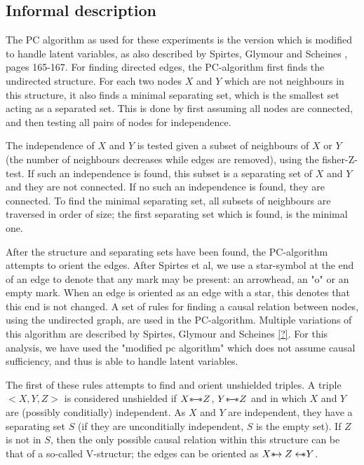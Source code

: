 \documentclass[a4paper, 10pt, english, onecolumn]{article}
\def \srightarrow {\text{\textasteriskcentered}\hspace{-0.62em}\rightarrow}
\def \sleftarrow {\leftarrow\hspace{-0.62em}\text{\textasteriskcentered}}
\def \sline {\text{\textasteriskcentered}\hspace{-0.38em}-\hspace{-0.4em}\text{\textasteriskcentered}}
\begin{document}
\subsection{Informal description}
The PC algorithm as used for these experiments is the version which is modified to handle latent variables, as also described by Spirtes, Glymour and Scheines \cite{spirtes2000}, pages 165-167.
For finding directed edges, the PC-algorithm first finds the undirected structure.
For each two nodes $X$ and $Y$ which are not neighbours in this structure, it also finds a minimal separating set, which is the smallest set acting as a separated set.
This is done by first assuming all nodes are connected, and then testing all pairs of nodes for independence.

The independence of $X$ and $Y$ is tested given a subset of neighbours of $X$ or $Y$ (the number of neighbours decreases while edges are removed), using the fisher-Z-test.
If such an independence is found, this subset is a separating set of $X$ and $Y$ and they are not connected.
If no such an independence is found, they are connected.
To find the minimal separating set, all subsets of neighbours are traversed in order of size; the first separating set which is found, is the minimal one.

After the structure and separating sets have been found, the PC-algorithm attempts to orient the edges.
After Spirtes et al, we use a star-symbol at the end of an edge to denote that any mark may be present: an arrowhead, an "o" or an empty mark.
When an edge is oriented as an edge with a star, this denotes that this end is not changed.
A set of rules for finding a causal relation between nodes, using the undirected graph, are used in the PC-algorithm. Multiple variations of this algorithm are described by Spirtes, Glymour and Scheines \ref{?}. For this analysis, we have used the "modified pc algorithm" which does not assume causal sufficiency, and thus is able to handle latent variables.

The first of these rules attempts to find and orient unshielded triples.
A triple $<X, Y, Z>$ is considered unshielded if $X \sline Z$, $Y \sline Z$ and in which $X$ and $Y$ are (possibly conditially) independent.
As $X$ and $Y$ are independent, they have a separating set $S$ (if they are unconditially independent, $S$ is the empty set).
If $Z$ is not in $S$, then the only possible causal relation within this structure can be that of a so-called V-structur; the edges can be oriented as $X \srightarrow Z \sleftarrow Y$.
\end{document}
